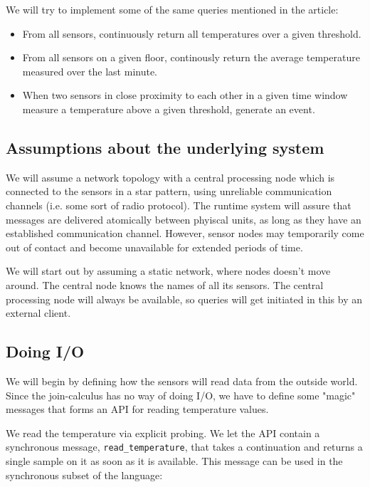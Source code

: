 We will try to implement some of the same queries mentioned in the
article:

\begin{itemize}
\item
  From all sensors, continuously return all temperatures over a given
  threshold.

\item
  From all sensors on a given floor, continously return the average
  temperature measured over the last minute.

\item
  When two sensors in close proximity to each other in a given time
  window measure a temperature above a given threshold, generate an
  event.

\end{itemize}
\subsection{Assumptions about the underlying system}

We will assume a network topology with a central processing node
which is connected to the sensors in a star pattern, using
unreliable communication channels (i.e. some sort of radio
protocol). The runtime system will assure that messages are
delivered atomically between phyiscal units, as long as they have
an established communication channel. However, sensor nodes may
temporarily come out of contact and become unavailable for extended
periods of time.

We will start out by assuming a static network, where nodes doesn't
move around. The central node knows the names of all its sensors.
The central processing node will always be available, so queries
will get initiated in this by an external client.

\subsection{Doing I/O}

We will begin by defining how the sensors will read data from the
outside world. Since the join-calculus has no way of doing I/O, we
have to define some "magic" messages that forms an API for reading
temperature values.

We read the temperature via explicit probing. We let the API
contain a synchronous message, \verb!read_temperature!, that takes
a continuation and returns a single sample on it as soon as it is
available. This message can be used in the synchronous subset of
the language:

